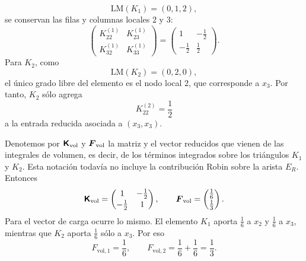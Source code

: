 \documentclass[11pt]{article}
\def\mat   #1{\mbox{\boldmath $\mathsf #1$}}
\def\vec   #1{\mbox{\boldmath $#1$}{}}
\begin{document}
\begin{enumerate}[label=\textbf{\arabic*.}, leftmargin=*]
\begin{enumerate}[label=(\alph*)]
        \[
            \mathrm{LM}(K_1)=(0,1,2),
        \]
        se conservan las filas y columnas locales $2$ y $3$:
        \[
            \begin{pmatrix}
                K^{(1)}_{22}&K^{(1)}_{23}\\
                K^{(1)}_{32}&K^{(1)}_{33}
            \end{pmatrix}
            =
            \begin{pmatrix}
                1&-\frac12\\[0.3ex]
                -\frac12&\frac12
            \end{pmatrix}.
        \]
        Para $K_2$, como
        \[
            \mathrm{LM}(K_2)=(0,2,0),
        \]
        el único grado libre del elemento es el nodo local $2$, que corresponde a $x_3$. Por tanto, $K_2$ sólo agrega
        \[
            K^{(2)}_{22}=\frac12
        \]
        a la entrada reducida asociada a $(x_3,x_3)$.

        Denotemos por $\mat K_{\mathrm{vol}}$ y $\vec F_{\mathrm{vol}}$ la matriz y el vector reducidos que vienen de las integrales de volumen, es decir, de los términos integrados sobre los triángulos $K_1$ y $K_2$. Esta notación todavía no incluye la contribución Robin sobre la arista $E_R$. Entonces
        \[
            \mat K_{\mathrm{vol}}=
            \begin{pmatrix}
                1&-\frac12\\[0.3ex]
                -\frac12&1
            \end{pmatrix},
            \qquad
            \vec F_{\mathrm{vol}}=
            \begin{pmatrix}
                \frac16\\[0.3ex]
                \frac13
            \end{pmatrix}.
        \]
        Para el vector de carga ocurre lo mismo. El elemento $K_1$ aporta $\frac16$ a $x_2$ y $\frac16$ a $x_3$, mientras que $K_2$ aporta $\frac16$ sólo a $x_3$. Por eso
        \[
            F_{\mathrm{vol},1}=\frac16,
            \qquad
            F_{\mathrm{vol},2}=\frac16+\frac16=\frac13.
        \]


\end{enumerate}
\end{enumerate}
\end{document}
